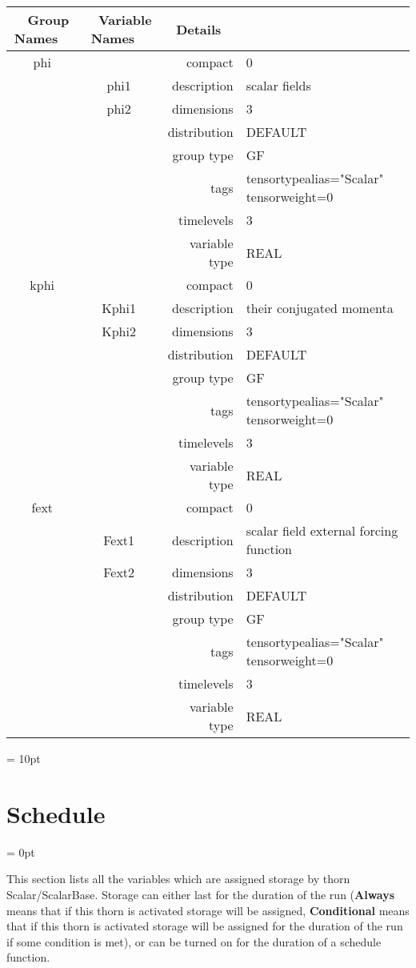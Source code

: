 \begin{tabular*}{150mm}{|c|c@{\extracolsep{\fill}}|rl|} \hline 
~ {\bf Group Names} ~ & ~ {\bf Variable Names} ~  &{\bf Details} ~ & ~\\ 
\hline 
phi &  & compact & 0 \\ 
 & phi1 & description & scalar fields \\ 
 & phi2 & dimensions & 3 \\ 
 &  & distribution & DEFAULT \\ 
 &  & group type & GF \\ 
 &  & tags & tensortypealias="Scalar" tensorweight=0 \\ 
 &  & timelevels & 3 \\ 
 &  & variable type & REAL \\ 
\hline 
kphi &  & compact & 0 \\ 
 & Kphi1 & description & their conjugated momenta \\ 
 & Kphi2 & dimensions & 3 \\ 
 &  & distribution & DEFAULT \\ 
 &  & group type & GF \\ 
 &  & tags & tensortypealias="Scalar" tensorweight=0 \\ 
 &  & timelevels & 3 \\ 
 &  & variable type & REAL \\ 
\hline 
fext &  & compact & 0 \\ 
 & Fext1 & description & scalar field external forcing function \\ 
 & Fext2 & dimensions & 3 \\ 
 &  & distribution & DEFAULT \\ 
 &  & group type & GF \\ 
 &  & tags & tensortypealias="Scalar" tensorweight=0 \\ 
 &  & timelevels & 3 \\ 
 &  & variable type & REAL \\ 
\hline 
\end{tabular*} 



\vspace{5mm}\parskip = 10pt 

\section{Schedule} 


\parskip = 0pt


\noindent This section lists all the variables which are assigned storage by thorn Scalar/ScalarBase.  Storage can either last for the duration of the run ({\bf Always} means that if this thorn is activated storage will be assigned, {\bf Conditional} means that if this thorn is activated storage will be assigned for the duration of the run if some condition is met), or can be turned on for the duration of a schedule function.


